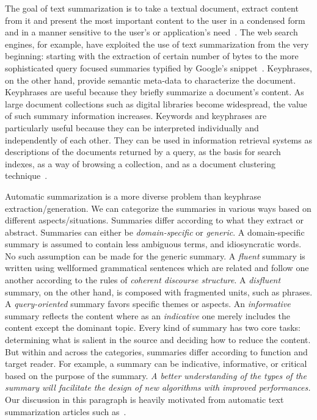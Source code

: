 \documentclass[a4paper]{report}
\begin{document}
\par The goal of text summarization is to take a textual document, extract content from it and present the most important content to the user in a condensed form and in a manner sensitive to the user's or application's need~\cite{DBLP:conf/acl/ManiM01}. The web search engines, for example, have exploited the use of text summarization from the very beginning: starting with the extraction of certain number of bytes to the more sophisticated query focused summaries typified by Google's snippet~\cite{Zha:2002:GSK:564376.564398}. Keyphrases, on the other hand, provide semantic meta-data to characterize the document. Keyphrases are useful because they briefly summarize a document's content. As large document collections such as digital libraries become widespread, the value of such summary information increases. Keywords and keyphrases are particularly useful because they can be interpreted individually and independently of each other. They can be used in information retrieval systems as descriptions of the documents returned by a query, as the basis for search indexes, as a way of browsing a collection, and as a document clustering technique~\cite{Witten:1999:KPA:313238.313437}.\\

\par  Automatic summarization is a more diverse problem than keyphrase extraction/generation. We can categorize the summaries in various ways based on different aspects/situations. Summaries differ according to what they extract or abstract. Summaries can either be \emph{domain-specific} or \emph{generic}. A domain-specific summary is assumed to contain less ambiguous terms, and idiosyncratic words. No such assumption can be made for the generic summary. A \emph{fluent} summary is written using wellformed grammatical sentences which are related and follow one another according to the rules of \emph{coherent discourse structure}. A \emph{disfluent} summary, on the other hand, is composed with fragmented units, such as phrases. A \emph{query-oriented} summary favors specific themes or aspects. An \emph{informative} summary reflects the content where as an \emph{indicative} one merely includes the content except the dominant topic. Every kind of summary has two core tasks: determining what is salient in the source and deciding how to reduce the content. But within and across the categories, summaries differ according to function and target reader. For example, a summary can be indicative, informative, or critical based on the purpose of the summary. \emph{A better understanding of the types of the summary will facilitate the design of new algorithms with improved performances.} Our discussion in this paragraph is heavily motivated from automatic text summarization articles such as~\cite{Hovy:1998:ATS:1119089.1119121, Hahn:2000:CAS:619057.621587}. \\ 
\end{document}
